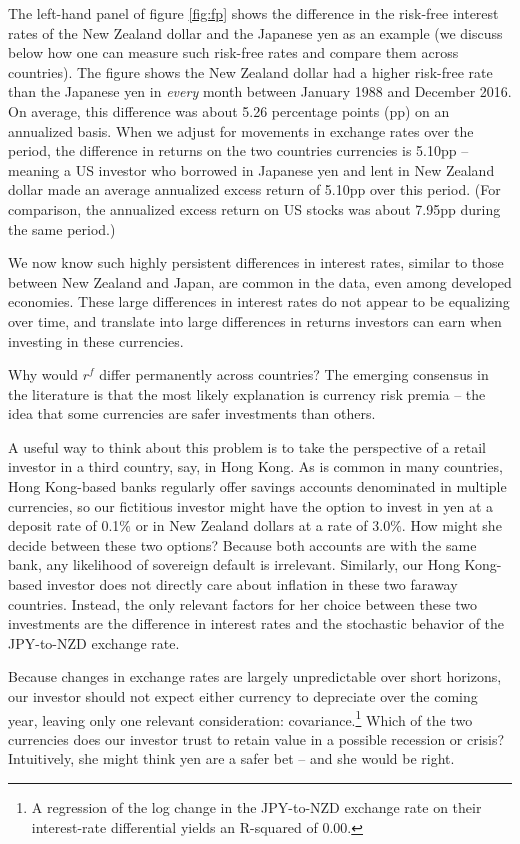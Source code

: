 \documentclass{ar-1col}
\begin{document}
The left-hand panel of figure \ref{fig:fp} shows the difference in the risk-free interest rates of the New Zealand dollar and the Japanese yen as an example (we discuss below how one can measure such risk-free rates and compare them across countries). The figure shows the New Zealand dollar had a higher risk-free rate than the Japanese yen in \textit{every} month between January 1988 and December 2016. On average, this difference was about 5.26 percentage points (pp) on an annualized basis. When we adjust for movements in exchange rates over the period, the difference in returns on the two countries currencies is 5.10pp -- meaning a US investor who borrowed in Japanese yen and lent in New Zealand dollar made an average annualized excess return of 5.10pp over this period. (For comparison, the annualized excess return on US stocks was about 7.95pp during the same period.)

We now know such highly persistent differences in interest rates, similar to those between New Zealand and Japan, are common in the data, even among developed economies. These large differences in interest rates do not appear to be equalizing over time, and translate into large differences in returns investors can earn when investing in these currencies.

Why would $r^f$ differ permanently across countries? The emerging consensus in the literature is that the most likely explanation is currency risk premia -- the idea that some currencies are safer investments than others.

A useful way to think about this problem is to take the perspective of a retail investor in a third country, say, in Hong Kong. As is common in many countries, Hong Kong-based banks regularly offer savings accounts denominated in multiple currencies, so our fictitious investor might have the option to invest in yen at a deposit rate of 0.1\% or in New Zealand dollars at a rate of 3.0\%. How might she decide between these two options? Because both accounts are with the same bank, any likelihood of sovereign default is irrelevant. Similarly, our Hong Kong-based investor does not directly care about inflation in these two faraway countries. Instead, the only relevant factors for her choice between these two investments are the difference in interest rates and the stochastic behavior of the JPY-to-NZD exchange rate.

Because changes in exchange rates are largely unpredictable over short horizons, our investor should not expect either currency to depreciate over the coming year, leaving only one relevant consideration: covariance.\footnote{A regression of the log change in the JPY-to-NZD exchange rate on their interest-rate differential yields an R-squared of 0.00.} Which of the two currencies does our investor trust to retain value in a possible recession or crisis? Intuitively, she might think yen are a safer bet -- and she would be right.
\end{document}
